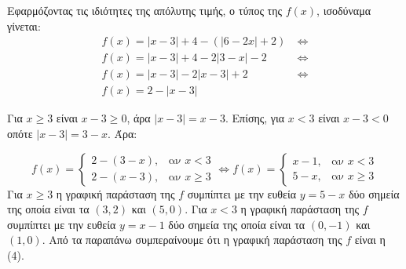 
\begin{alist}
\item Εφαρμόζοντας τις ιδιότητες της απόλυτης τιμής, ο τύπος της $f(x)$, ισοδύναμα γίνεται:
\begin{align*}
f(x) = |x - 3| + 4 - (|6 - 2x| + 2) \ &\Leftrightarrow \\
f(x) = |x - 3| + 4 - 2|3 - x| - 2 \ &\Leftrightarrow \\
f(x) = |x - 3| - 2|x - 3| + 2 \ &\Leftrightarrow \\
f(x) = 2 - |x - 3|&
\end{align*}
\item Για $x \ge 3$ είναι $x - 3 \ge 0$, άρα $|x - 3| = x - 3$. Επίσης, για $x < 3$ είναι $x - 3 < 0$ οπότε $|x - 3| = 3 - x$. Άρα:

\[f(x) = \begin{cases} 2 - (3 - x), & \text{αν } x < 3 \\ 2 - (x - 3), & \text{αν } x \ge 3 \end{cases} \Leftrightarrow f(x) = \begin{cases} x - 1, & \text{αν } x < 3 \\ 5 - x, & \text{αν } x \ge 3 \end{cases}\]
Για $x \ge 3$ η γραφική παράσταση της $f$ συμπίπτει με την ευθεία $y = 5 - x$ δύο σημεία της οποία είναι τα $(3, 2)$ και $(5, 0)$.
Για $x < 3$ η γραφική παράσταση της $f$ συμπίπτει με την ευθεία $y = x - 1$ δύο σημεία της οποία είναι τα $(0, -1)$ και $(1, 0)$. Από τα παραπάνω συμπεραίνουμε ότι η γραφική παράσταση της $f$ είναι η (4).
\begin{center}
\end{center}


\end{alist}
